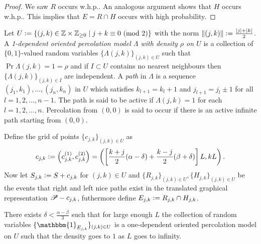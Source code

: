 \begin{proof}
We saw $R$ occurs w.h.p.. An analogous argument shows that $H$ occurs w.h.p.. This implies that $E = R \cap H$ occurs with high probability. 
\end{proof}

\begin{definition}
Let $U \vcentcolon= \{ (j, k) \in \mathbb{Z} \times \mathbb{Z}_{\geq 0} \mid j + k \equiv 0\ (\text{mod } 2)\}$ with the norm $\Vert(j,k)\Vert \vcentcolon= \frac{|j| + |k|}{2}$. A \textit{1-dependent oriented percolation model $\Lambda$ with density $\rho$ on $U$} is a collection of $\{0,1\}$-valued random variables $\{\Lambda(j,k)\}_{(j,k) \in U}$ such that $\Pr{\Lambda(j,k) = 1} = \rho$ and if $I \subset U$ contains no nearest neighbours then $\{\Lambda(j,k)\}_{(j,k) \in I}$ are independent. A \textit{path} in $\Lambda$ is a sequence $(j_1,k_1), ..., (j_n, k_n)$ in $U$ which satisfies $k_{l+1} = k_l + 1$ and $j_{l+1} = j_l \pm 1$ for all $l = 1, 2, ..., n - 1$. The path is said to be active if $\Lambda(j,k) = 1$ for each $l = 1,2,...,n$. Percolation from $(0,0)$ is said to occur if there is an active infinite path starting from $(0,0)$. 
\end{definition}

Define the grid of points $\{c_{j, k} \}_{(j, k) \in U}$ as
\[
c_{j, k} \vcentcolon= \left(c^{(1)}_{j,k}, c^{(2)}_{j,k}\right) = \left( \left[ \frac{k + j}{2}(\alpha - \delta) + \frac{k - j}{2}(\beta + \delta) \right] L, k L\right). 
\]
Now let $S_{j,k} \vcentcolon= S + c_{j,k}$ for $(j,k) \in U$ and $\{R_{j,k}\}_{(j,k)\in U}, \{H_{j,k}\}_{(j,k) \in U}$ be the events that right and left nice paths exist in the translated graphical representation $\mathscr{P} - c_{j,k}$, futhermore define $E_{j,k} \vcentcolon= R_{j,k} \cap H_{j,k}$. 

\begin{theorem}\label{thm:percolation}
There exists $\delta < \frac{\alpha - \beta}{3}$ such that for large enough $L$ the collection of random variables $\{\mathbbm{1}_{E_{j,k}}\}_{(j,k) \in U}$ is a one-dependent oriented percolation model on $U$ such that the density goes to $1$ as $L$ goes to infinity. 
\end{theorem}


